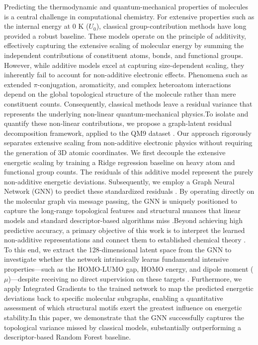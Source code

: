 \documentclass[]{article}
\begin{document}
Predicting the thermodynamic and quantum-mechanical properties of molecules is a central challenge in computational chemistry. For extensive properties such as the internal energy at 0 K ($U_0$), classical group-contribution methods have long provided a robust baseline. These models operate on the principle of additivity, effectively capturing the extensive scaling of molecular energy by summing the independent contributions of constituent atoms, bonds, and functional groups. However, while additive models excel at capturing size-dependent scaling, they inherently fail to account for non-additive electronic effects. Phenomena such as extended $\pi$-conjugation, aromaticity, and complex heteroatom interactions depend on the global topological structure of the molecule rather than mere constituent counts. Consequently, classical methods leave a residual variance that represents the underlying non-linear quantum-mechanical physics.To isolate and quantify these non-linear contributions, we propose a graph-latent residual decomposition framework, applied to the QM9 dataset \citep{fu2025benchmarkquantumchemistryrelaxations}. Our approach rigorously separates extensive scaling from non-additive electronic physics without requiring the generation of 3D atomic coordinates. We first decouple the extensive energetic scaling by training a Ridge regression baseline on heavy atom and functional group counts. The residuals of this additive model represent the purely non-additive energetic deviations. Subsequently, we employ a Graph Neural Network (GNN) to predict these standardized residuals \citep{schütt2016quantumchemicalinsightsdeeptensor,xiang2025edbenchlargescaleelectrondensity}. By operating directly on the molecular graph via message passing, the GNN is uniquely positioned to capture the long-range topological features and structural nuances that linear models and standard descriptor-based algorithms miss \citep{schütt2016quantumchemicalinsightsdeeptensor,esders2024analyzingatomicinteractionsmolecules,xiang2025edbenchlargescaleelectrondensity}.Beyond achieving high predictive accuracy, a primary objective of this work is to interpret the learned non-additive representations and connect them to established chemical theory \citep{wang2023graphneuralnetworksmolecules,liu2026latentflowvisualanalyticslatent,han2026multimodalmolecularrepresentationlearning}. To this end, we extract the 128-dimensional latent space from the GNN to investigate whether the network intrinsically learns fundamental intensive properties—such as the HOMO-LUMO gap, HOMO energy, and dipole moment ($\mu$)—despite receiving no direct supervision on these targets \citep{choi2022scalabletraininggraphconvolutional,liu2026enhancingmolecularpropertypredictions,chakraborty2026duallevelatomiccoordinationgeometry}. Furthermore, we apply Integrated Gradients to the trained network to map the predicted energetic deviations back to specific molecular subgraphs, enabling a quantitative assessment of which structural motifs exert the greatest influence on energetic stability.In this paper, we demonstrate that the GNN successfully captures the topological variance missed by classical models, substantially outperforming a descriptor-based Random Forest baseline. 
\end{document}
